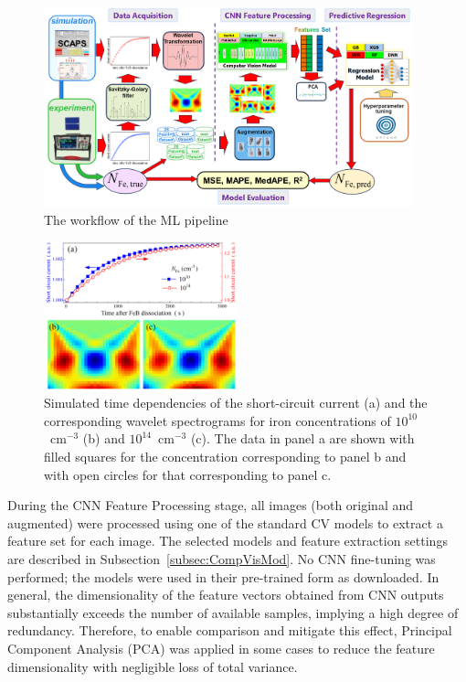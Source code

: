 \documentclass[10pt]{iopart}
\begin{document}
\begin{figure}
\includegraphics[width=0.95\textwidth]{Fig1}
\caption{\label{Fig1}
The workflow of the ML pipeline
}%
\end{figure}

\begin{figure}
\includegraphics[width=0.5\textwidth]{Fig2}
\caption{\label{Fig2}
Simulated time dependencies of the short-circuit current (a)
and the corresponding wavelet spectrograms for iron concentrations
of $10^{10}$~cm$^{-3}$ (b) and $10^{14}$~cm$^{-3}$ (c).
The data in panel a are shown with filled squares for the concentration corresponding to panel b
and with open circles for that corresponding to panel c.
}%
\end{figure}


During the CNN Feature Processing stage, all images (both original and augmented) were processed using one of the standard CV models
to extract a feature set for each image.
The selected models and feature extraction settings are described in Subsection~\ref{subsec:CompVisMod}.
No CNN fine-tuning was performed; the models were used in their pre-trained form as downloaded.
In general, the dimensionality of the feature vectors obtained from CNN outputs substantially exceeds the number of available samples,
implying a high degree of redundancy.
Therefore, to enable comparison and mitigate this effect, Principal Component Analysis (PCA) was applied in some cases
to reduce the feature dimensionality with negligible loss of total variance.
\end{document}
